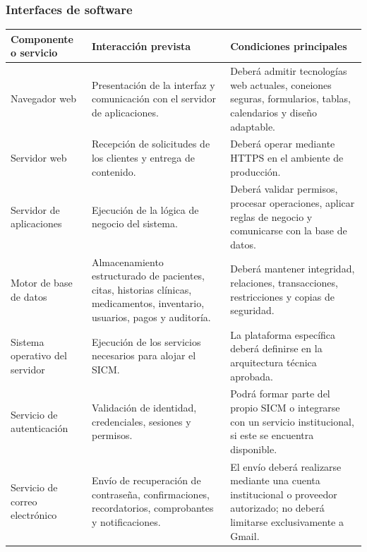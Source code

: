 \documentclass[11pt,a4paper]{article}
\begin{document}
	\subsubsection{ Interfaces de software}
	
	\begin{longtable}{p{} p{} p{}}
		
		
		\toprule
		\textbf{Componente o servicio} &
		\textbf{Interacción prevista} &
		\textbf{Condiciones principales} \\
		\midrule
		\endhead
		
		\bottomrule
		\endlastfoot
		
		Navegador web &
		Presentación de la interfaz y comunicación con el servidor de aplicaciones. &
		Deberá admitir tecnologías web actuales, coneiones seguras, formularios,
		tablas, calendarios y diseño adaptable. \\
		
		Servidor web &
		Recepción de solicitudes de los clientes y entrega de contenido. &
		Deberá operar mediante HTTPS en el ambiente de producción. \\
		
		Servidor de aplicaciones &
		Ejecución de la lógica de negocio del sistema. &
		Deberá validar permisos, procesar operaciones, aplicar reglas de negocio y
		comunicarse con la base de datos. \\
		
		Motor de base de datos &
		Almacenamiento estructurado de pacientes, citas, historias clínicas,
		medicamentos, inventario, usuarios, pagos y auditoría. &
		Deberá mantener integridad, relaciones, transacciones, restricciones y copias de
		seguridad. \\
		
		Sistema operativo del servidor &
		Ejecución de los servicios necesarios para alojar el SICM. &
		La plataforma específica deberá definirse en la arquitectura técnica aprobada. \\
		
		Servicio de autenticación &
		Validación de identidad, credenciales, sesiones y permisos. &
		Podrá formar parte del propio SICM o integrarse con un servicio institucional,
		si este se encuentra disponible. \\
		
		Servicio de correo electrónico &
		Envío de recuperación de contraseña, confirmaciones, recordatorios,
		comprobantes y notificaciones. &
		El envío deberá realizarse mediante una cuenta institucional o proveedor
		autorizado; no deberá limitarse exclusivamente a Gmail. \\
		

\end{longtable}
\end{document}

